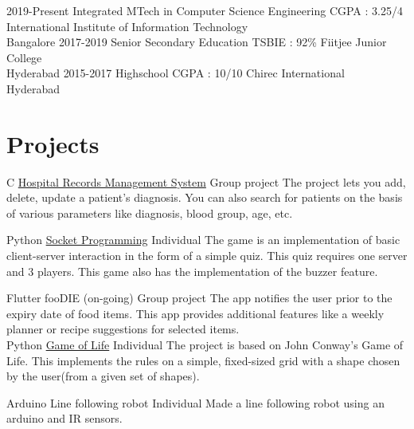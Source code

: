 \documentclass[a4paper]{fortysecondscv}
\begin{document}
\makefrontsidebar

\begin{cvtable}[1.5]
  \cvitem
    {2019-Present}
    {Integrated MTech in Computer Science Engineering}
    {CGPA  : 3.25/4}
    {International Institute of Information Technology\\Bangalore}
  \cvitem
    {2017-2019}
    {Senior Secondary Education}
    {TSBIE :    92\%}
    {Fiitjee Junior College\\Hyderabad}
  \cvitem
    {2015-2017}
    {Highschool}
    {CGPA  : 10/10}
    {Chirec International\\Hyderabad}
\end{cvtable}


\section{Projects}
\begin{cvtable}
  \cvitem
    {C}
    {\href{https://gitlab.com/avantikaaa/hospital-records-management-system}{Hospital Records Management System}}    
    {Group project}
    {The project lets you add, delete, update a patient's diagnosis. You can also search for patients on the basis of various parameters like diagnosis, blood group, age, etc.\\}

  \cvitem
    {Python}
    {\href{https://gitlab.com/avantikaaa/socket-programming}{Socket Programming}}
    {Individual}
    {The game is an implementation of basic client-server interaction in the form of a simple quiz. This quiz requires one server and 3 players. This game also has the implementation of the buzzer feature.\\}

  \cvitem
    {Flutter}
    {fooDIE (on-going)}
    {Group project}
    {The app notifies the user prior to the expiry date of food items. This app provides additional features like a weekly planner or recipe suggestions for selected items.}\\
    
  \cvitem
  	{Python}
  	{\href{https://gitlab.com/avantikaaa/game-of-life}{Game of Life}}
  	{Individual}
  	{The project is based on John Conway's Game of Life. This implements the rules on a simple, fixed-sized grid with a shape chosen by the user(from a given set of shapes).\\}
  
  \cvitem
  	{Arduino}
  	{Line following robot}
  	{Individual}
  	{Made a line following robot using an arduino and IR sensors.\\}
\end{cvtable}
\end{document}
